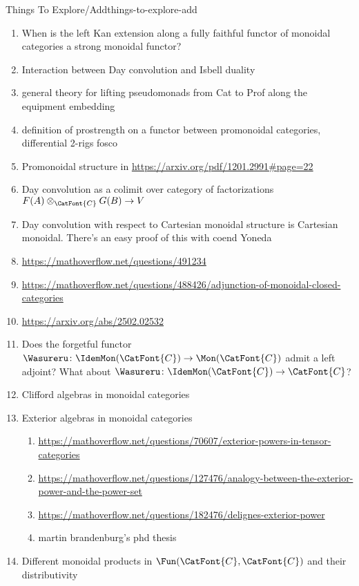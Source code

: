 \begin{remark}{Things To Explore/Add}{things-to-explore-add}
\begin{enumerate}
        \item When is the left Kan extension along a fully faithful functor of monoidal categories a strong monoidal functor?
        \item Interaction between Day convolution and Isbell duality
        \item general theory for lifting pseudomonads from Cat to Prof along the equipment embedding
        \item definition of prostrength on a functor between promonoidal categories, differential 2-rigs fosco
        \item Promonoidal structure in \url{https://arxiv.org/pdf/1201.2991#page=22}
        \item Day convolution as a colimit over category of factorizations $F(A)\otimes_{\CatFont{C}}G(B)\to V$
        \item Day convolution with respect to Cartesian monoidal structure is Cartesian monoidal. There's an easy proof of this with coend Yoneda
        \item \url{https://mathoverflow.net/questions/491234}
        \item \url{https://mathoverflow.net/questions/488426/adjunction-of-monoidal-closed-categories}
        \item \url{https://arxiv.org/abs/2502.02532}
        \item Does the forgetful functor $\Wasureru\colon\IdemMon(\CatFont{C})\to\Mon(\CatFont{C})$ admit a left adjoint? What about $\Wasureru\colon\IdemMon(\CatFont{C})\to\CatFont{C}$?
        \item Clifford algebras in monoidal categories
        \item Exterior algebras in monoidal categories
            \begin{enumerate}
                \item \url{https://mathoverflow.net/questions/70607/exterior-powers-in-tensor-categories}
                \item \url{https://mathoverflow.net/questions/127476/analogy-between-the-exterior-power-and-the-power-set}
                \item \url{https://mathoverflow.net/questions/182476/delignes-exterior-power}
                \item martin brandenburg's phd thesis
            \end{enumerate}
        \item Different monoidal products in $\Fun(\CatFont{C},\CatFont{C})$ and their distributivity

\end{enumerate}
\end{remark}
